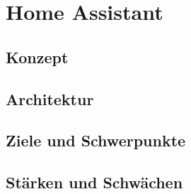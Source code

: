 \section{Home Assistant}
\subsection{Konzept}
\subsection{Architektur}
\subsection{Ziele und Schwerpunkte}
\subsection{Stärken und Schwächen}

